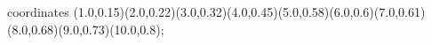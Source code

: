 					coordinates { (1.0,0.15)(2.0,0.22)(3.0,0.32)(4.0,0.45)(5.0,0.58)(6.0,0.6)(7.0,0.61)(8.0,0.68)(9.0,0.73)(10.0,0.8)};